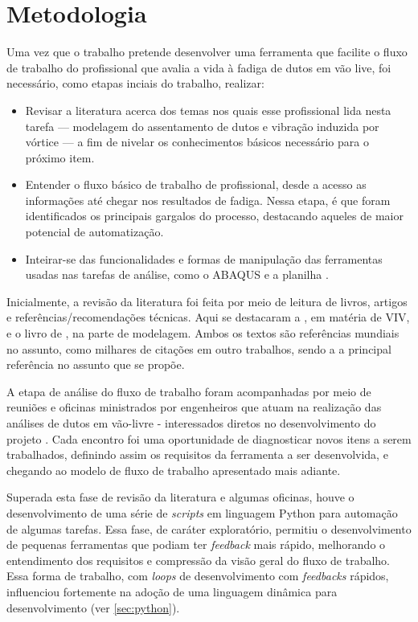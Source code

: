 \chapter{Metodologia}\label{chap:metodologia}


Uma vez que o trabalho pretende desenvolver uma ferramenta que facilite o fluxo de trabalho do profissional que avalia a vida à fadiga de dutos em vão live, foi necessário, como etapas inciais do trabalho, realizar:

\begin{itemize}
    \item Revisar a literatura acerca dos temas nos quais esse profissional lida nesta tarefa --- modelagem do assentamento de dutos e vibração induzida por vórtice --- a fim de nivelar os conhecimentos básicos necessário para o próximo item.
    \item Entender o fluxo básico de trabalho de profissional, desde a acesso as informações até chegar nos resultados de fadiga. Nessa etapa, é que foram identificados os principais gargalos do processo, destacando aqueles de maior potencial de automatização.
    \item Inteirar-se das funcionalidades e formas de manipulação das ferramentas usadas nas tarefas de análise, como o ABAQUS e a planilha \fatfree.
\end{itemize}

Inicialmente, a revisão da literatura foi feita por meio de leitura de livros, artigos e referências/recomendações técnicas.
Aqui se destacaram a , em matéria de VIV, e o livro de , na parte de modelagem.
Ambos os textos são referências mundiais no assunto, como milhares de citações em outro trabalhos, sendo a  a principal referência no assunto que se propõe.

A etapa de análise do fluxo de trabalho foram acompanhadas por meio de reuniões e oficinas ministrados por engenheiros que atuam na realização das análises de dutos em vão-livre - interessados diretos no desenvolvimento do projeto \integrispan.
Cada encontro foi uma oportunidade de diagnosticar novos itens a serem trabalhados, definindo assim os requisitos da ferramenta a ser desenvolvida, e chegando ao modelo de fluxo de trabalho apresentado mais adiante.

Superada esta fase de revisão da literatura e algumas oficinas, houve o desenvolvimento de uma série de \textit{scripts} em linguagem Python para automação de algumas tarefas.
Essa fase, de caráter exploratório, permitiu o desenvolvimento de pequenas ferramentas que podiam ter \textit{feedback} mais rápido, melhorando o entendimento dos requisitos e compressão da visão geral do fluxo de trabalho.
Essa forma de trabalho, com \textit{loops} de desenvolvimento com \textit{feedbacks} rápidos, influenciou fortemente na adoção de uma linguagem dinâmica para desenvolvimento (ver \autoref{sec:python}). %

